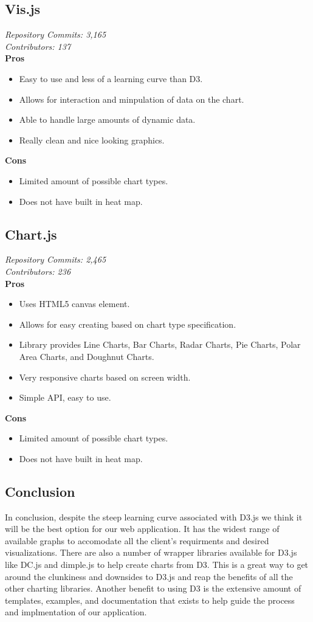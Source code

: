 \documentclass[onecolumn, draftclsnofoot,10pt, compsoc]{IEEEtran}
\begin{document}
\subsection{Vis.js}
\textit{Repository Commits: 3,165}\\
\textit{Contributors: 137}\\
\textbf{Pros}
\begin{itemize}
\item Easy to use and less of a learning curve than D3.
\item Allows for interaction and minpulation of data on the chart.
\item Able to handle large amounts of dynamic data.
\item Really clean and nice looking graphics.
\end{itemize}
\textbf{Cons}
\begin{itemize}
\item Limited amount of possible chart types.
\item Does not have built in heat map.
\end{itemize}
\subsection{Chart.js}
\textit{Repository Commits: 2,465}\\ 
\textit{Contributors: 236}\\
\textbf{Pros}
\begin{itemize}
\item Uses HTML5 canvas element.
\item Allows for easy creating based on chart type specification.
\item Library provides Line Charts, Bar Charts, Radar Charts, Pie Charts, Polar Area Charts, and Doughnut Charts.
\item Very responsive charts based on screen width.
\item Simple API, easy to use.
\end{itemize}
\textbf{Cons}
\begin{itemize}
\item Limited amount of possible chart types.
\item Does not have built in heat map.
\end{itemize}
\subsection{Conclusion}
In conclusion, despite the steep learning curve associated with D3.js we think it will be the best option for our web application. It has the widest range of available graphs to accomodate all the client's requirments and desired visualizations. There are also a number of wrapper libraries available for D3.js like DC.js and dimple.js to help create charts from D3. This is a great way to get around the clunkiness and downsides to D3.js and reap the benefits of all the other charting libraries. Another benefit to using D3 is the extensive amount of templates, examples, and documentation that exists to help guide the process and implmentation of our application.
\end{document}
